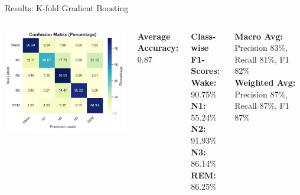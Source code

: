 \begin{frame}{Results: K-fold Gradient Boosting}
	\begin{columns}
		\centering
		\includegraphics[width=\linewidth]{"images/paper_1/GB 1.1"}
		
		\scriptsize
		\textbf{Average Accuracy:} 0.87
		
		\vspace{0.3em}
		\textbf{Class-wise F1-Scores:} \\
		\textbf{Wake:} 90.75\% \\
		\textbf{N1:} 55.24\% \\
		\textbf{N2:} 91.93\% \\
		\textbf{N3:} 86.14\% \\
		\textbf{REM:} 86.25\%
		
		\vspace{0.3em}
		\textbf{Macro Avg:} Precision 83\%, Recall 81\%, F1 82\% \\
		\textbf{Weighted Avg:} Precision 87\%, Recall 87\%, F1 87\%
	\end{columns}
\end{frame}


